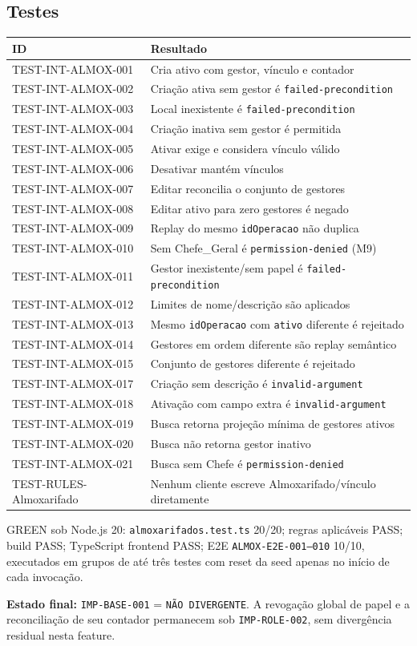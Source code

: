 \subsection{Testes}

\small
\begin{longtable}{@{}p{}p{}@{}}
\toprule
ID & Resultado \\
\midrule
\endhead
TEST-INT-ALMOX-001 & Cria ativo com gestor, vínculo e contador \\
TEST-INT-ALMOX-002 & Criação ativa sem gestor é \texttt{failed-precondition} \\
TEST-INT-ALMOX-003 & Local inexistente é \texttt{failed-precondition} \\
TEST-INT-ALMOX-004 & Criação inativa sem gestor é permitida \\
TEST-INT-ALMOX-005 & Ativar exige e considera vínculo válido \\
TEST-INT-ALMOX-006 & Desativar mantém vínculos \\
TEST-INT-ALMOX-007 & Editar reconcilia o conjunto de gestores \\
TEST-INT-ALMOX-008 & Editar ativo para zero gestores é negado \\
TEST-INT-ALMOX-009 & Replay do mesmo \texttt{idOperacao} não duplica \\
TEST-INT-ALMOX-010 & Sem Chefe\_Geral é \texttt{permission-denied} (M9) \\
TEST-INT-ALMOX-011 & Gestor inexistente/sem papel é \texttt{failed-precondition} \\
TEST-INT-ALMOX-012 & Limites de nome/descrição são aplicados \\
TEST-INT-ALMOX-013 & Mesmo \texttt{idOperacao} com \texttt{ativo} diferente é rejeitado \\
TEST-INT-ALMOX-014 & Gestores em ordem diferente são replay semântico \\
TEST-INT-ALMOX-015 & Conjunto de gestores diferente é rejeitado \\
TEST-INT-ALMOX-017 & Criação sem descrição é \texttt{invalid-argument} \\
TEST-INT-ALMOX-018 & Ativação com campo extra é \texttt{invalid-argument} \\
TEST-INT-ALMOX-019 & Busca retorna projeção mínima de gestores ativos \\
TEST-INT-ALMOX-020 & Busca não retorna gestor inativo \\
TEST-INT-ALMOX-021 & Busca sem Chefe é \texttt{permission-denied} \\
TEST-RULES-Almoxarifado & Nenhum cliente escreve Almoxarifado/vínculo diretamente \\
\bottomrule
\end{longtable}
\normalsize

GREEN sob Node.js 20: \texttt{almoxarifados.test.ts} 20/20; regras aplicáveis
PASS; build PASS; TypeScript frontend PASS; E2E
\texttt{ALMOX-E2E-001--010} 10/10, executados em grupos de até três testes com
reset da seed apenas no início de cada invocação.

\textbf{Estado final:} \texttt{IMP-BASE-001} = \texttt{NÃO DIVERGENTE}. A
revogação global de papel e a reconciliação de seu contador permanecem sob
\texttt{IMP-ROLE-002}, sem divergência residual nesta feature.
